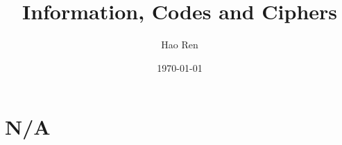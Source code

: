\documentclass{article}
\begin{document}
\title{Information, Codes and Ciphers}
\author{Hao Ren}
\date{\today}
\maketitle

\section{N/A}
\end{document}
